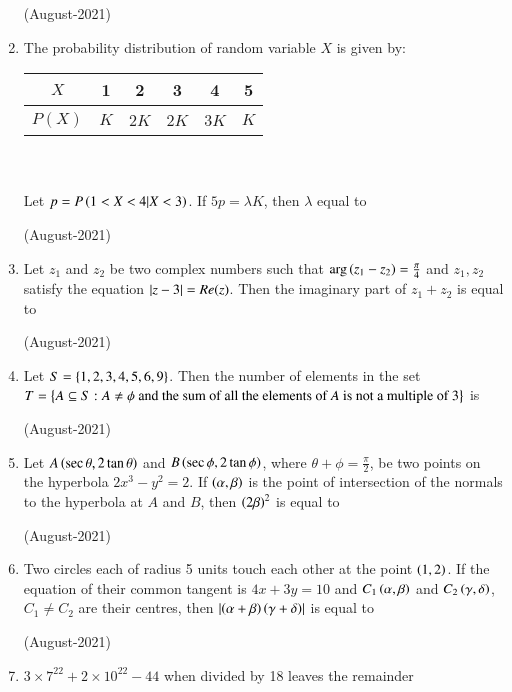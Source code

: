 \documentclass[journal]{IEEEtran}
\begin{document}
\begin{enumerate}
    \hfill (August-2021) 
    
    \item The probability distribution of random variable $X$ is given by: \\
    \begin{tabular}[12pt]{ |c| c| c|c|c|c|}
    \hline
    $X$ & 1 & 2 & 3 & 4 & 5 \\
    \hline
    $P(X)$ & $K$ & 2$K$ & 2$K$ & 3$K$ & $K$ \\
    \hline 
    \end{tabular} \\ \\
    Let $p = P \left(1 < X < 4 | X < 3\right)$. If $5p = \lambda K$, then $\lambda$ equal to 
    
    \hfill(August-2021) 
    
    \item Let $z_1$ and $z_2$ be two complex numbers such that $\arg{\ensuremath{\left(z_1 - z_2\right)}} = \frac{\pi}{4}$ 
 and $z_1, z_2$ satisfy the equation $\left\vert z -
 3 \right\vert= Re(z)$. Then the imaginary part of $z_1 + z_2$ is equal to 
 
 \hfill(August-2021)
 
 \item Let $S=\left\{1, 2, 3, 4, 5, 6, 9\right\}$. Then the number of elements in the set $T = \left\{ A\subseteq 
 S : A \neq \phi  \text{ and the sum of all the elements of $A$ is not a multiple of 3}\right\}$ is 
     
     \hfill(August-2021)
     
    \item Let $A\left(\sec \theta, 2\tan \theta\right)$ and $B \left(\sec \phi, 2 \tan \phi\right)$, where $\theta + \phi = \frac{\pi}{2}$, be two points on the hyperbola $2x^3 - y^2 = 2$. If $\left(\alpha, \beta\right)$ is the point of intersection of the normals to the hyperbola at $A$ and $B$, then $\left(2\beta\right)^2$ is equal to 
    
    \hfill (August-2021)
    
    \item Two circles each of radius 5 units touch each other at the point $\left(1,2\right)$. If the equation of their common tangent is $4x + 3y = 10$ and $C_1 \left(\alpha,\beta\right)$ and $C_2 \left(\gamma, \delta\right)$, $C_1 \neq C_2$ are their centres, then $\left\vert\left(\alpha+\beta\right)\left(\gamma+\delta\right)\right\vert$
    is equal to 
    
    \hfill (August-2021)
    
    \item $3 \times 7^{22} + 2 \times 10^{22} - 44$ when divided by 18 leaves the remainder  
    

\end{enumerate}
\end{document}
